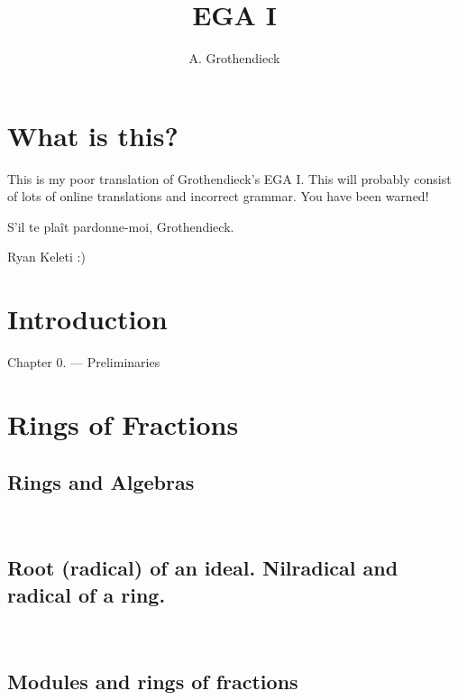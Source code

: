 \documentclass[10pt]{amsart}
\title{EGA I}
\author{A. Grothendieck}
\date{ }
\theoremstyle{plain}
\theoremstyle{definition}
\begin{document}
\maketitle
\tableofcontents{}

\section*{What is this?}

This is my poor translation of Grothendieck's EGA I. This
will probably consist of lots of online translations and incorrect grammar.
You have been warned!

S'il te pla\^it pardonne-moi, Grothendieck.

Ryan Keleti :)

\section*{Introduction}


Chapter 0. --- Preliminaries
\section*{Rings of Fractions}
\subsection*{Rings and Algebras}\mbox{}\\

\subsection*{Root (radical) of an ideal. Nilradical and radical of a ring.}\mbox{}\\

\subsection*{Modules and rings of fractions}\mbox{}\\

\end{document}
